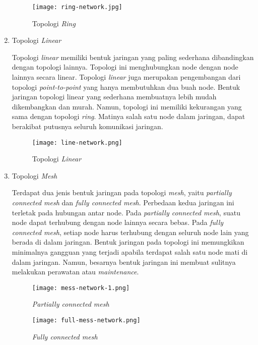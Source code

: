 \begin{enumerate}
    \begin{figure}[H]
    	\centering  
    	\texttt{[image: ring-network.jpg]}  
    	\caption[Topologi \textit{Ring}]{Topologi \textit{Ring}}
    	\label{fig:Topologi Ring} 
    \end{figure}
    
    \item Topologi \textit{Linear}
    
    Topologi \textit{linear} memiliki bentuk jaringan yang paling sederhana dibandingkan dengan topologi lainnya. Topologi ini menghubungkan node dengan node lainnya secara linear. Topologi \textit{linear} juga merupakan pengembangan dari topologi \textit{point-to-point} yang hanya membutuhkan dua buah node. Bentuk jaringan topologi linear yang sederhana membuatnya lebih mudah dikembangkan dan murah. Namun, topologi ini memiliki kekurangan yang sama dengan topologi \textit{ring}. Matinya salah satu node dalam jaringan, dapat berakibat putusnya seluruh komunikasi jaringan.
    
    \begin{figure}[H]
    	\centering  
    	\texttt{[image: line-network.png]}  
    	\caption[Topologi \textit{Linear}]{Topologi \textit{Linear}}
    	\label{fig:Topologi Linear} 
    \end{figure}
    
    \item Topologi \textit{Mesh} 
    
    Terdapat dua jenis bentuk jaringan pada topologi \textit{mesh}, yaitu \textit{partially connected mesh} dan \textit{fully connected mesh}. Perbedaan kedua jaringan ini terletak pada hubungan antar node. Pada \textit{partially connected mesh}, suatu node dapat terhubung dengan node lainnya secara bebas. Pada \textit{fully connected mesh}, setiap node harus terhubung dengan seluruh node lain yang berada di dalam jaringan. Bentuk jaringan pada topologi ini memungkikan minimalnya gangguan yang terjadi apabila terdapat salah satu node mati di dalam jaringan. Namun, besarnya bentuk jaringan ini membuat sulitnya melakukan perawatan atau \textit{maintenance}.
    
    \begin{figure}[H]
    	\centering  
    	\texttt{[image: mess-network-1.png]}  
    	\caption[\textit{Partially connected mesh}]{\textit{Partially connected mesh}}
    	\label{fig:Partially connected mesh}
    \end{figure}
    
    \begin{figure}[H]
    	\centering  
    	\texttt{[image: full-mess-network.png]}  
    	\caption[\textit{Fully connected mesh}]{\textit{Fully connected mesh}}
    	\label{fig:Fully connected mesh} 
    \end{figure}
    
\end{enumerate}

